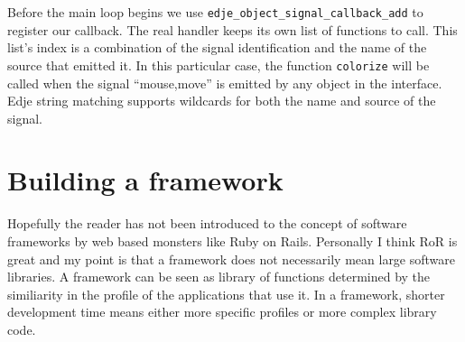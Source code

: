 \documentclass[12pt,a4paper,english]{book}
\begin{document}
Before the main loop begins we use \texttt{edje{\_}object{\_}signal{\_}callback{\_}add} to
register our callback. The real handler keeps its own list of functions to call.
This list's index is a combination of the signal identification and the name of
the source that emitted it. In this particular case, the function \texttt{colorize}
will be called when the signal ``mouse,move'' is emitted by any object in the
interface. Edje string matching supports wildcards for both the name and source
of the signal.



\hypertarget{building-a-framework}{}
\section{Building a framework}
\label{building-a-framework}

Hopefully the reader has not been introduced to the concept of software
frameworks by web based monsters like Ruby on Rails. Personally I think RoR is
great and my point is that a framework does not necessarily mean large software
libraries. A framework can be seen as library of functions determined by the
similiarity in the profile of the applications that use it. In a framework,
shorter development time means either more specific profiles or more complex
library code.
\end{document}
